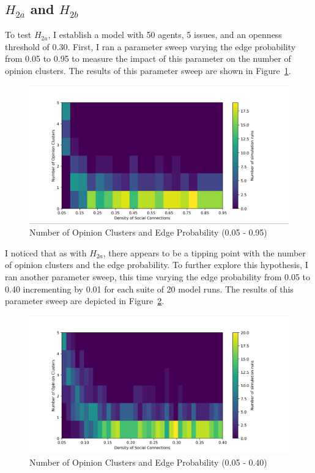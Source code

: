 \subsection{$H_{2a}$ and $H_{2b}$}

To test $H_{2a}$, I establish a model with 50 agents, 5 issues, and an
openness threshold of 0.30. First, I ran a parameter sweep varying the edge
probability from 0.05 to 0.95 to measure the impact of this parameter on the
number of opinion clusters. The results of this parameter sweep are shown in
Figure~\ref{H2a_plot_big}.

\begin{figure}
\centering
\includegraphics[width=1.0\columnwidth]{./Graphs/ClusterEdge/Cluster_edgeBig.png}
\caption{Number of Opinion Clusters and Edge Probability (0.05 - 0.95)}
\label{H2a_plot_big}
\end{figure}

I noticed that as with $H_{2a}$, there appears to be a tipping point with the
number of opinion clusters and the edge probability. To further explore this
hypothesis, I ran another parameter sweep, this time varying the edge
probability from 0.05 to 0.40 incrementing by 0.01 for each suite of 20 model
runs. The results of this parameter sweep are depicted in
Figure~\ref{H2a_plot_small}.

\begin{figure}
\centering
\includegraphics[width=1.0\columnwidth]{./Graphs/ClusterEdge/Cluster_edgesmall.png}
\caption{Number of Opinion Clusters and Edge Probability (0.05 - 0.40)}
\label{H2a_plot_small}
\end{figure}

